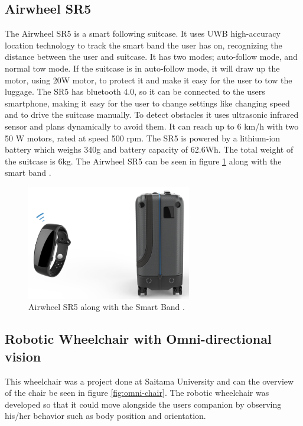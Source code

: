 \subsection{Airwheel SR5}
The Airwheel SR5 is a smart following suitcase. 
It uses UWB high-accuracy location technology to track the smart band the user has on, recognizing the distance between the user and suitcase.
It has two modes; auto-follow mode, and normal tow mode. 
If the suitcase is in auto-follow mode, it will draw up the motor, using 20W motor, to protect it and make it easy for the user to tow the luggage.
The SR5 has bluetooth 4.0, so it can be connected to the users smartphone, making it easy for the user to change settings like changing speed and to drive the suitcase manually. 
To detect obstacles it uses ultrasonic infrared sensor and plans dynamically to avoid them. 
It can reach up to 6 km/h with two 50 W motors, rated at speed 500 rpm. 
The SR5 is powered by a lithium-ion battery which weighs 340g and battery capacity of 62.6Wh.
The total weight of the suitcase is 6kg. 
The Airwheel SR5 can be seen in figure \ref{fig:airwheelsr5} along with the smart band \cite{airwheel_functions_2022}. 

\begin{figure}[!ht]
    \centering
    \includegraphics[height=50mm]{graphics/airwheel_sr5.png}
    \caption{Airwheel SR5 along with the Smart Band \cite{airwheel_functions_2022}.}
    \label{fig:airwheelsr5}
\end{figure}



\subsection{Robotic Wheelchair with Omni-directional vision}
This wheelchair was a project done at Saitama University and can the overview of the chair be seen in figure \ref{fig:omni-chair}. 
The robotic wheelchair was developed so that it could move alongside the users companion by observing his/her behavior such as body position and orientation.

